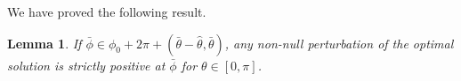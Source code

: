 \documentclass[reqno]{amsart}
\theoremstyle{definition} \newtheorem{definition}{Definition}[section]
\theoremstyle{definition} \newtheorem{remark}[definition]{Remark}
\theoremstyle{plain} \newtheorem{lemma}[definition]{Lemma}
\theoremstyle{plain} \newtheorem{proposition}[definition]{Proposition}
\theoremstyle{plain} \newtheorem{theorem}[definition]{Theorem}
\theoremstyle{plain} \newtheorem{corollary}[definition]{Corollary}
\theoremstyle{definition} \newtheorem{example}[definition]{Example}
\theoremstyle{plain} \newtheorem{claim}[clai]{Claim}
\theoremstyle{definition} \newtheorem{assumption}[definition]{Assumption}
\theoremstyle{definition} \newtheorem{observation}[definition]{Observation}
\newcommand{\1}{\mathbbm 1}
\numberwithin{equation}{section} %
\theoremstyle{plain} \newtheorem*{theorem*}{Theorem}
\theoremstyle{plain} \newtheorem{mthm}[maintheorem]{Main Theorem}
\theoremstyle{plain} \newtheorem*{mthm*}{Main Theorem}
\theoremstyle{plain} \newtheorem*{conjecture*}{Conjecture}
\theoremstyle{plain} \newtheorem{conjecture}[definition]{Conjecture}
\theoremstyle{plain} \newtheorem*{problem*}{Problem}
\begin{document}
We have proved the following result.

\begin{lemma}
\label{Lem:segm_segm_2_case}
If $\bar \phi \in \phi_0 + 2\pi + (\bar \theta-\hat \theta,\bar \theta)$, any non-null perturbation of the optimal solution is strictly positive at $\bar \phi$ for $\theta \in [0,\pi]$.
\end{lemma}


%
%
%
\end{document}
